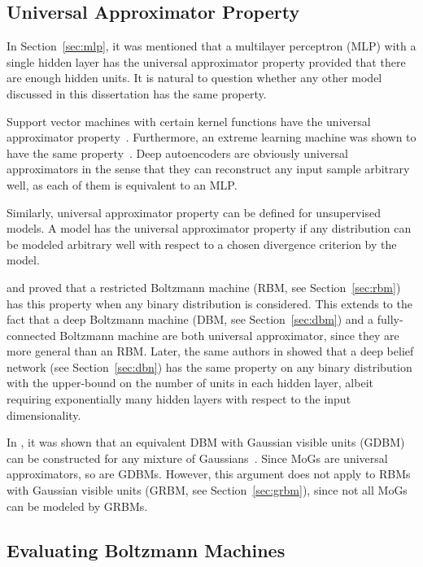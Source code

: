 \documentclass{now}
\begin{document}
\subsection{Universal Approximator Property}
\label{sec:uap}

In Section~\ref{sec:mlp}, it was mentioned that a multilayer perceptron (MLP)
with a single hidden layer has the universal approximator property provided that
there are enough hidden units.  It is natural to question whether any other
model discussed in this dissertation has the same property. 

Support vector machines with certain kernel functions have the universal
approximator property~\citep{Hammer2003}.  Furthermore, an extreme learning
machine was shown to have the same property~\citep{Huang2006tnn}. Deep
autoencoders are obviously universal approximators in the sense that they can
reconstruct any input sample arbitrary well, as each of them is equivalent to an
MLP.

Similarly, universal approximator property can be defined for unsupervised
models. A model has the universal approximator property if any distribution can
be modeled arbitrary well with respect to a chosen divergence criterion by the
model.

\citet{Roux2008} and \citet{Freund1994}  proved that a restricted Boltzmann
machine (RBM, see Section~\ref{sec:rbm}) has this property when any binary
distribution is considered. This extends to the fact that a deep Boltzmann
machine (DBM, see Section~\ref{sec:dbm}) and a fully-connected Boltzmann machine
are both universal approximator, since they are more general than an RBM.
Later, the same authors in \citep{Roux2010} showed that a deep belief network
(see Section~\ref{sec:dbn}) has the same property on any binary distribution
with the upper-bound on the number of units in each hidden layer, albeit
requiring exponentially many hidden layers with respect to the input
dimensionality. 

In \citep{Cho13IJCNN}, it was shown that an equivalent DBM with Gaussian visible
units (GDBM) can be constructed for any mixture of Gaussians~\citep[MoG, see,
e.g.,][]{Bishop2006}.  Since MoGs are
universal approximators, so are GDBMs. However, this argument does not apply to
RBMs with Gaussian visible units (GRBM, see Section~\ref{sec:grbm}), since not
all MoGs can be modeled by GRBMs.

\subsection{Evaluating Boltzmann Machines}
\label{sec:eval_bm}
\end{document}
